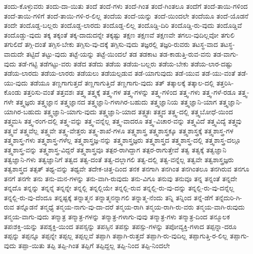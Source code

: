 {ತಂದು-ಕೊಳ್ಳುವರು
ತಂದು-ದಾ-ಯಿತು
ತಂದೆ
ತಂದೆ-ಗಳು
ತಂದೆ-ಗಿಂತ
ತಂದೆ-ಗಿಂತಲೂ
ತಂದೆಗೆ
ತಂದೆ-ತಾಯಿ-ಗಳಿಂದ
ತಂದೆ-ತಾಯಿ-ಗಳಿಗೆ
ತಂದೆ-ತಾಯಿ-ಗಳಿ-ರ-ಲಿಲ್ಲ
ತಂದೆಯ
ತಂದೆ-ಯನ್ನು
ತಂದೆ-ಯಿಂದಲೇ
ತಂದೆಯೂ
ತಂದೆ-ಯೊಡನೆ
ತಂದೇ
ತಂದೊಡ್ಡ-ಬಲ್ಲರು
ತಂದೊಡ್ಡ-ಲಾರದು
ತಂದೊಡ್ಡ-ಲಿಲ್ಲ
ತಂದೊಡ್ಡಿ-ದಿರಿ
ತಂದೊಡ್ಡಿ-ರು-ವುದು
ತಂದೊಡ್ಡಿವೆ
ತಂದೊಡ್ಡು-ವುದು
ತಕ್ಕ
ತಕ್ಕಂತೆ
ತಕ್ಕ-ದಾದುದನ್ನೇ
ತಕ್ಕಷ್ಟು
ತಕ್ಷಣ
ತಕ್ಷಣವೆ
ತಕ್ಷಣವೇ
ತಗಲು-ವುದಿಲ್ಲವೋ
ತಗುಲಿ
ತಗುಲಿದೆ
ತಗ್ಗಿ-ದಂತೆ
ತಗ್ಗಿಸ-ಬೇಕು
ತಗ್ಗಿಸು-ವು-ದಕ್ಕೆ
ತಗ್ಗಿಸು-ವುದು
ತಜ್ಞರಲ್ಲಿ
ತಜ್ಞರಿ-ರುವರು
ತಟಸ್ಥ-ವಾದ
ತಟಸ್ಥ-ವಾದುದೇ
ತಟ್ಟಿದೆ
ತಟ್ಟು-ವುದು
ತಟ್ಟೆ-ಯನ್ನು
ತಟ್ಟೆ-ಯಿಂದಲೆ
ತಡ
ತಡಕಾಟ
ತಡ-ಕಾಡುತ್ತಿ-ರುವ-ವನು
ತಡ-ವಾಗು-ವುದು
ತಡೆ-ಗಟ್ಟಿ
ತಡೆಗಟ್ಟು-ವರು
ತಡೆದ
ತಡೆದು
ತಡೆಯ
ತಡೆಯ-ಬಲ್ಲರು
ತಡೆಯ-ಬೇಕು
ತಡೆಯ-ಲಾರ-ದಷ್ಟು
ತಡೆಯ-ಲಾರದು
ತಡೆಯ-ಲಾರರು
ತಡೆಯಲು
ತಡೆಯಲ್ಪಡುವ
ತಡೆ-ಯಾಗುವುದು
ತಡೆ-ಯುವ
ತಡೆ-ಯು-ವಂತೆ
ತಡೆ-ಯು-ವುದು
ತಡೆಯೂ
ತಣ್ಣಗಾಗುತ್ತದೆ
ತಣ್ಣಗಾಗುತ್ತಿದೆ
ತಣ್ಣಗಾಗು-ವುದು
ತತ್
ತತ್ಕಾಲಕ್ಕೆ
ತತ್ಕಾಲ-ದಲ್ಲಿ
ತತ್ತರಿಸಿ-ಕೊಂಡು
ತತ್ತರಿಸು-ವಂತೆ
ತತ್ತವಶಃ
ತತ್ತ್ವ
ತತ್ತ್ವಕ್ಕೆ
ತತ್ತ್ವ-ಗಳ
ತತ್ತ್ವ-ಗಳನ್ನು
ತತ್ತ್ವ-ಗಳಿಂದ
ತತ್ತ್ವ-ಗಳು
ತತ್ತ್ವ-ಗಳೆ-ರಡೂ
ತತ್ತ್ವ-ಗಳೇ
ತತ್ತ್ವಜ್ಞರು
ತತ್ತ್ವಜ್ಞಾನ
ತತ್ತ್ವಜ್ಞಾನದ
ತತ್ತ್ವಜ್ಞಾನಿ-ಗಳಾಗಿರ-ಬಹುದು
ತತ್ತ್ವಜ್ಞಾನಿಯ
ತತ್ತ್ವಜ್ಞಾನಿ-ಯಾಗ
ತತ್ತ್ವಜ್ಞಾನಿ-ಯಾಗಿರ-ಬಹುದು
ತತ್ತ್ವಜ್ಞಾನಿ-ಯಾಗು-ವುದು
ತತ್ತ್ವಜ್ಞಾನಿ-ಯಾದ
ತತ್ತ್ವತಃ
ತತ್ತ್ವದ
ತತ್ತ್ವ-ದಲ್ಲಿ
ತತ್ತ್ವಬೋಧೆ-ಯಿಂದ
ತತ್ತ್ವಮಸಿ
ತತ್ತ್ವ-ರಂಗ-ದಲ್ಲಿ
ತತ್ತ್ವ-ವನ್ನು
ತತ್ತ್ವ-ವನ್ನೆಲ್ಲ
ತತ್ತ್ವ-ವಾದರೂ
ತತ್ತ್ವ-ವಿಚಾರ-ವನ್ನು
ತತ್ತ್ವವಿದೆ
ತತ್ತ್ವವಿದ್ಯೆ
ತತ್ತ್ವವು
ತತ್ತ್ವವೆ
ತತ್ತ್ವವೆಲ್ಲ
ತತ್ತ್ವವೇ
ತತ್ತ್ವ-ವೇತ್ತರು
ತತ್ತ್ವ-ಶಾಖೆ-ಗಳೂ
ತತ್ತ್ವಶಾಸ್ತ್ರ
ತತ್ತ್ವಶಾಸ್ತ್ರಕ್ಕೂ
ತತ್ತ್ವಶಾಸ್ತ್ರಕ್ಕೆ
ತತ್ತ್ವಶಾಸ್ತ್ರ-ಗಳ
ತತ್ತ್ವಶಾಸ್ತ್ರ-ಗಳು
ತತ್ತ್ವಶಾಸ್ತ್ರ-ಗಳೆಲ್ಲ
ತತ್ತ್ವಶಾಸ್ತ್ರಜ್ಞ-ನನ್ನು
ತತ್ತ್ವಶಾಸ್ತ್ರಜ್ಞರು
ತತ್ತ್ವಶಾಸ್ತ್ರದ
ತತ್ತ್ವಶಾಸ್ತ್ರ-ದಲ್ಲಿ
ತತ್ತ್ವಶಾಸ್ತ್ರ-ದಲ್ಲೂ
ತತ್ತ್ವಶಾಸ್ತ್ರ-ವನ್ನು
ತತ್ತ್ವಶಾಸ್ತ್ರ-ವಿದ್ದರೆ
ತತ್ತ್ವಶಾಸ್ತ್ರವೂ
ತತ್ಪರ-ರಾಗಿದ್ದಾಗ
ತತ್ಪರ-ರಾಗುತ್ತೇವೆ
ತತ್ವ
ತತ್ವಕ್ಕೆ
ತತ್ವಜ್ಞಾನಿ
ತತ್ವಜ್ಞಾನಿ-ಗಳು
ತತ್ವಜ್ಞಾನಿಗೆ
ತತ್ವದ
ತತ್ವ-ದಂತೆ
ತತ್ವ-ದಲ್ಲಾಗಲಿ
ತತ್ವ-ದಲ್ಲಿ
ತತ್ವ-ವನ್ನೆಲ್ಲ
ತತ್ವವೇ
ತತ್ವಶಾಸ್ತ್ರಜ್ಞರು
ತತ್ವಶಾಸ್ತ್ರದ
ತತ್ಸತ್
ತಥ್ಯ-ವನ್ನು
ತಥ್ಯವೇ
ತದೇಕ-ಚಿತ್ತ-ದಿಂದ
ತನಕ
ತನಗಾಗಿ
ತನಗಿಂತ
ತನಗಿಂತಲೂ
ತನಗಿರುವ
ತನಗೂ
ತನಗೆ
ತನಗೇ
ತನು
ತನು-ಮನ-ಗಳನ್ನು
ತನು-ವಾಗಿ-ರುವುದು
ತನು-ವಿಗೂ
ತನುವು
ತನುವೂ
ತನ್ನ
ತನ್ನಂತೆ
ತನ್ನದೇ
ತನ್ನದೊ
ತನ್ನನ್ನು
ತನ್ನನ್ನೆ
ತನ್ನನ್ನೇ
ತನ್ನಲ್ಲಿ
ತನ್ನಲ್ಲಿಯೇ
ತನ್ನಲ್ಲಿ-ರುವ
ತನ್ನಲ್ಲಿ-ರು-ವು-ದನ್ನು
ತನ್ನಲ್ಲಿ-ರು-ವು-ದನ್ನೆಲ್ಲ
ತನ್ನಲ್ಲಿ-ರು-ವು-ದೆಂದೂ
ತನ್ನಷ್ಟಕ್ಕೆ
ತನ್ನಾತ್ಮನ
ತನ್ನಾತ್ಮನನ್ನಾಗಲಿ
ತನ್ನಾತ್ಮ-ನೆಂದು
ತನ್ನಿ
ತನ್ನಿಂದ
ತನ್ನೆ-ಡೆಗೆ
ತನ್ನೆದುರಿ-ಗಿ-ರುವ
ತನ್ನೊಡನೆ
ತನ್ಮಧ್ಯೆ
ತನ್ಮಯ-ನಾಗು-ವು-ದಾ-ದರೆ
ತನ್ಮಯ-ರಾಗಿ
ತನ್ಮಯ-ರಾಗಿ-ರು-ವರು
ತನ್ಮಯ-ವಾಗಿ-ರುವುದು
ತನ್ಮಯ-ವಾಗು-ವುದು
ತನ್ಮಾತ್ರ
ತನ್ಮಾತ್ರ-ಗಳನ್ನು
ತನ್ಮಾತ್ರ-ಗಳಾಗು-ವುವು
ತನ್ಮಾತ್ರ-ಗಳು
ತನ್ಮಾತ್ರ-ದಿಂದ
ತನ್ಮೂಲಕ
ತಪಃಶಕ್ತಿ-ಯನ್ನು
ತಪಶ್ಶಕ್ತಿ-ಯಿಂದ
ತಪಸ್ಸನ್ನು
ತಪಸ್ಸಿನ
ತಪಸ್ಸು
ತಪಸ್ಸು-ಗಳನ್ನು
ತಪೋವ್ಯಕ್ತಿ-ಗಳಾದ
ತಪ್ಪನ್ನಾ-ದರೂ
ತಪ್ಪನ್ನು
ತಪ್ಪನ್ನೂ
ತಪ್ಪನ್ನೇ
ತಪ್ಪಲ್ಲ
ತಪ್ಪಲ್ಲವೆ
ತಪ್ಪಾಗಿ
ತಪ್ಪಾಗಿ-ರುತ್ತದೆ
ತಪ್ಪಾಗಿ-ರು-ವುದಿಲ್ಲ
ತಪ್ಪಾಗುತ್ತಿ-ರ-ಲಿಲ್ಲ
ತಪ್ಪಾಗು-ವುದು
ತಪ್ಪಾ-ಯಿತು
ತಪ್ಪಿ
ತಪ್ಪಿ-ಗಿಂತ
ತಪ್ಪಿಗೆ
ತಪ್ಪಿದ್ದಲ್ಲ
ತಪ್ಪಿ-ನಿಂದ
ತಪ್ಪಿ-ನಿಂದಲೇ
}
